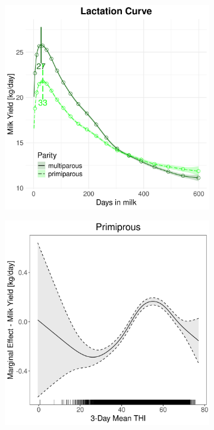 \begin{figure}[H]
\begin{subfigure}[b]{0.45\textwidth}
        \includegraphics[width=\textwidth]{thesis/figures/models/milk/after2010/je_milk_after2010/je_milk_after2010_marginal_dim_milk_combined.png}
    \end{subfigure}
    \begin{subfigure}[b]{0.45\textwidth}
        \centering
        \includegraphics[width=\textwidth]{thesis/figures/models/milk/after2010/je_milk_after2010/je_milk_after2010_marginal_thi_milk_primi.png}

\end{subfigure}
\end{figure}
